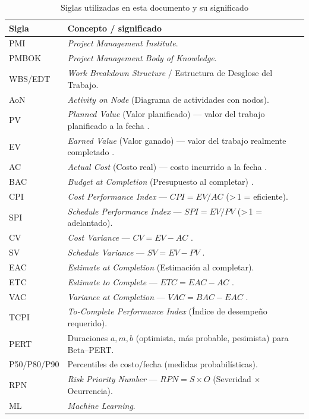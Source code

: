 \documentclass[12pt]
{charter}
\begin{document}
\begin{table}[h]
\centering
\caption{Siglas utilizadas en esta documento y su significado}
\begin{tabularx}{\textwidth}{lY}
\toprule
\textbf{Sigla} & \textbf{Concepto / significado} \\
\midrule
PMI & \textit{Project Management Institute}. \\
PMBOK & \textit{Project Management Body of Knowledge}. \\
WBS/EDT & \textit{Work Breakdown Structure} / Estructura de Desglose del Trabajo. \\
AoN & \textit{Activity on Node} (Diagrama de actividades con nodos). \\
PV & \textit{Planned Value} (Valor planificado) — valor del trabajo planificado a la fecha \;[\$]. \\
EV & \textit{Earned Value} (Valor ganado) — valor del trabajo realmente completado \;[\$]. \\
AC & \textit{Actual Cost} (Costo real) — costo incurrido a la fecha \;[\$]. \\
BAC & \textit{Budget at Completion} (Presupuesto al completar) \;[\$]. \\
CPI & \textit{Cost Performance Index} — $CPI = EV/AC$ (>\,1 = eficiente). \\
SPI & \textit{Schedule Performance Index} — $SPI = EV/PV$ (>\,1 = adelantado). \\
CV & \textit{Cost Variance} — $CV = EV - AC$ \;[\$]. \\
SV & \textit{Schedule Variance} — $SV = EV - PV$ \;[\$]. \\
EAC & \textit{Estimate at Completion} (Estimación al completar). \\
ETC & \textit{Estimate to Complete} — $ETC = EAC - AC$ \;[\$]. \\
VAC & \textit{Variance at Completion} — $VAC = BAC - EAC$ \;[\$]. \\
TCPI & \textit{To-Complete Performance Index} (Índice de desempeño requerido). \\
PERT & Duraciones $a,m,b$ (optimista, más probable, pesimista) para Beta–PERT. \\
P50/P80/P90 & Percentiles de costo/fecha (medidas probabilísticas). \\
RPN & \textit{Risk Priority Number} — $RPN = S \times O$ (Severidad $\times$ Ocurrencia). \\
ML & \textit{Machine Learning}. \\
\bottomrule
\end{tabularx}
\end{table}
\end{document}
